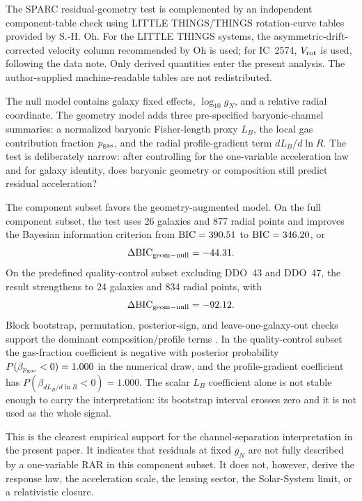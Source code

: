 ﻿\documentclass[twocolumn]{aastex631}
\begin{document}
The SPARC residual-geometry test is complemented by an independent component-table check using LITTLE THINGS/THINGS rotation-curve tables provided by S.-H. Oh.  For the LITTLE THINGS systems, the asymmetric-drift-corrected velocity column recommended by Oh is used; for IC~2574, $V_{\rm rot}$ is used, following the data note.  Only derived quantities enter the present analysis.  The author-supplied machine-readable tables are not redistributed.

The null model contains galaxy fixed effects, $\log_{10}g_N$, and a relative radial coordinate.  The geometry model adds three pre-specified baryonic-channel summaries: a normalized baryonic Fisher-length proxy $L_B$, the local gas contribution fraction $p_{\rm gas}$, and the radial profile-gradient term $dL_B/d\ln R$.  The test is deliberately narrow: after controlling for the one-variable acceleration law and for galaxy identity, does baryonic geometry or composition still predict residual acceleration?

The component subset favors the geometry-augmented model.  On the full component subset, the test uses 26 galaxies and 877 radial points and improves the Bayesian information criterion from ${\rm BIC}=390.51$ to ${\rm BIC}=346.20$, or
\begin{equation}
\Delta{\rm BIC}_{\rm geom-null}=-44.31 .
\end{equation}
On the predefined quality-control subset excluding DDO~43 and DDO~47, the result strengthens to 24 galaxies and 834 radial points, with
\begin{equation}
\Delta{\rm BIC}_{\rm geom-null}=-92.12 .
\end{equation}
Block bootstrap, permutation, posterior-sign, and leave-one-galaxy-out checks support the dominant composition/profile terms \citep{Efron1979,EfronTibshirani1993,Wilcoxon1945,Wilson1927}.  In the quality-control subset the gas-fraction coefficient is negative with posterior probability $P(\beta_{p_{\rm gas}}<0)=1.000$ in the numerical draw, and the profile-gradient coefficient has $P(\beta_{dL_B/d\ln R}<0)=1.000$.  The scalar $L_B$ coefficient alone is not stable enough to carry the interpretation: its bootstrap interval crosses zero and it is not used as the whole signal.

This is the clearest empirical support for the channel-separation interpretation in the present paper.  It indicates that residuals at fixed $g_N$ are not fully described by a one-variable RAR in this component subset.  It does not, however, derive the response law, the acceleration scale, the lensing sector, the Solar-System limit, or a relativistic closure.
\end{document}

